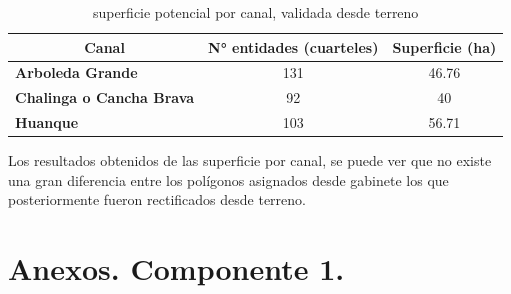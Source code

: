 \documentclass[]{article}
\begin{document}
\begin{table}[H]
\centering
\caption{superficie potencial por canal, validada desde terreno}
\label{my-label}
\begin{tabular}{|l|c|c|}
\hline
\multicolumn{1}{|c|}{\textbf{Canal}} & \textbf{N° entidades (cuarteles)} & \textbf{Superficie (ha)} \\ \hline
\textbf{Arboleda Grande}             & 131                               & 46.76                    \\ \hline
\textbf{Chalinga o Cancha Brava}     & 92                                & 40                       \\ \hline
\textbf{Huanque}                     & 103                               & 56.71                    \\ \hline
\end{tabular}
\end{table}

Los resultados obtenidos de las superficie por canal, se puede ver que no existe una gran diferencia entre los polígonos asignados desde gabinete los que posteriormente fueron rectificados desde terreno.

\clearpage
\section{Anexos. Componente 1.}
\end{document}
